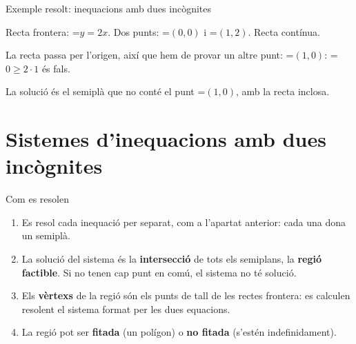 \documentclass[11pt,a4paper]{article}
\newcommand{\fmm}[1]{\setbox0=\hbox{$#1$}\ifdim\wd0>\linewidth\fmdisp{#1}\else\mbox{\box0}\fi}
\newcommand{\fmdisp}[1]{\[\setbox2=\hbox{$\displaystyle #1$}\ifdim\wd2>\linewidth\resizebox{\linewidth}{!}{\box2}\else\box2\fi\]}
\begin{document}
\begin{fmex}{Exemple resolt: inequacions amb dues incògnites}
\begin{enumerate}[label=\textbf{\arabic*.},leftmargin=*]
Recta frontera: \fmm{y=2x}. Dos punts: \fmm{(0,0)} i \fmm{(1,2)}. Recta contínua.

La recta passa per l'origen, així que hem de provar un altre punt: \fmm{(1,0)}: \fmm{0\ge2\cdot1} és fals.

La solució és el semiplà que no conté el punt \fmm{(1,0)}, amb la recta inclosa.

\begin{center}\end{center}
\end{enumerate}
\end{fmex}

\section{Sistemes d'inequacions amb dues incògnites}\hypertarget{sec5}{}
\begin{fmprop}{Com es resolen}
\begin{enumerate}
\item Es resol cada inequació per separat, com a l'apartat anterior: cada una dona un semiplà.
\item La solució del sistema és la \textbf{intersecció} de tots els semiplans, la \textbf{regió factible}. Si no tenen cap punt en comú, el sistema no té solució.
\item Els \textbf{vèrtexs} de la regió són els punts de tall de les rectes frontera: es calculen resolent el sistema format per les dues equacions.
\item La regió pot ser \textbf{fitada} (un polígon) o \textbf{no fitada} (s'estén indefinidament).
\end{enumerate}
\end{fmprop}
\end{document}
